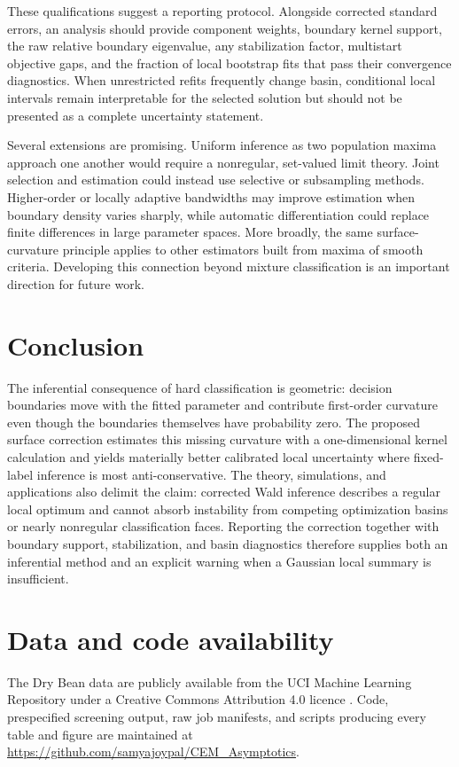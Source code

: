 \documentclass[numsec,webpdf,modern,medium,namedate]{oup-authoring-template}
\theoremstyle{plain}
\theoremstyle{definition}
\theoremstyle{remark}
\begin{document}
These qualifications suggest a reporting protocol.  Alongside corrected
standard errors, an analysis should provide component weights, boundary kernel
support, the raw relative boundary eigenvalue, any stabilization factor,
multistart objective gaps, and the fraction of local bootstrap fits that pass
their convergence diagnostics.  When unrestricted refits frequently change
basin, conditional local intervals remain interpretable for the selected
solution but should not be presented as a complete uncertainty statement.

Several extensions are promising.  Uniform inference as two population maxima
approach one another would require a nonregular, set-valued limit theory.
Joint selection and estimation could instead use selective or subsampling
methods.  Higher-order or locally adaptive bandwidths may improve estimation
when boundary density varies sharply, while automatic differentiation could
replace finite differences in large parameter spaces.  More broadly, the same
surface-curvature principle applies to other estimators built from maxima of
smooth criteria.  Developing this connection beyond mixture classification is
an important direction for future work.

\section{Conclusion}
The inferential consequence of hard classification is geometric: decision
boundaries move with the fitted parameter and contribute first-order
curvature even though the boundaries themselves have probability zero. The
proposed surface correction estimates this missing curvature with a
one-dimensional kernel calculation and yields materially better calibrated
local uncertainty where fixed-label inference is most anti-conservative. The
theory, simulations, and applications also delimit the claim: corrected Wald
inference describes a regular local optimum and cannot absorb instability from
competing optimization basins or nearly nonregular classification faces.
Reporting the correction together with boundary support, stabilization, and
basin diagnostics therefore supplies both an inferential method and an
explicit warning when a Gaussian local summary is insufficient.

\section*{Data and code availability}
The Dry Bean data are publicly available from the UCI Machine Learning
Repository under a Creative Commons Attribution 4.0 licence
\citep{uci2020drybean}. Code, prespecified screening output, raw job manifests,
and scripts producing every table and figure are maintained at
\url{https://github.com/samyajoypal/CEM_Asymptotics}.
\end{document}
